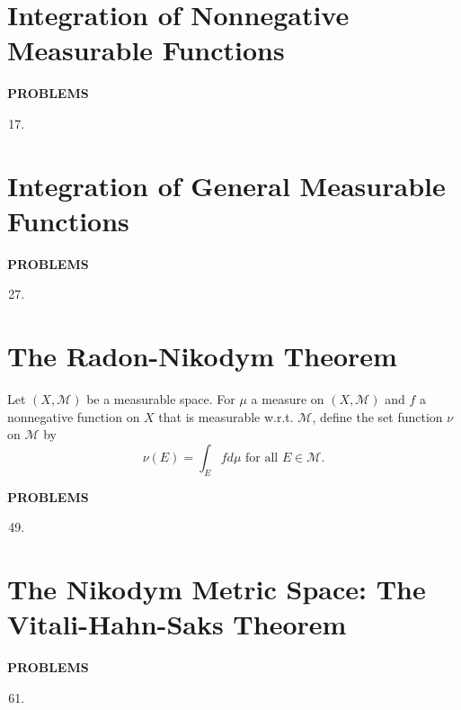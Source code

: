 \section{Integration of Nonnegative Measurable Functions}
\begin{center}
	\textbf{PROBLEMS}
\end{center}
\begin{enumerate}
	\setcounter{enumi}{16}
    \item 
\end{enumerate}

\section{Integration of General Measurable Functions}
\begin{center}
	\textbf{PROBLEMS}
\end{center}
\begin{enumerate}
	\setcounter{enumi}{26}
    \item 
\end{enumerate}

\section{The Radon-Nikodym Theorem}
Let $(X,\mathcal{M})$ be a measurable space.
For $\mu$ a measure on $(X,\mathcal{M})$ and $f$ a nonnegative function on $X$ that is measurable w.r.t. $\mathcal{M}$, define the set function $\nu$ on $\mathcal{M}$ by
\[
    \nu(E)=\int_Efd\mu\text{ for all }E\in\mathcal{M}.
\]
\begin{center}
	\textbf{PROBLEMS}
\end{center}
\begin{enumerate}
	\setcounter{enumi}{48}
    \item 
\end{enumerate}

\section{The Nikodym Metric Space: The Vitali-Hahn-Saks Theorem}
\begin{center}
	\textbf{PROBLEMS}
\end{center}
\begin{enumerate}
	\setcounter{enumi}{60}
    \item 
\end{enumerate}
